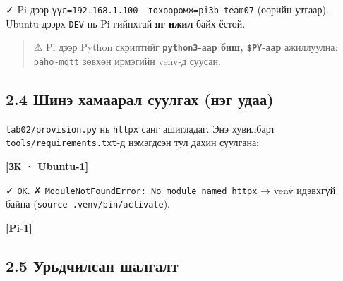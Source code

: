 ✓ Pi дээр \texttt{үүл=\allowbreak{}192.\allowbreak{}168.\allowbreak{}1.\allowbreak{}100\ \ төхөөрөмж=\allowbreak{}pi3b-team07} (өөрийн утгаар). Ubuntu дээрх \texttt{DEV} нь Pi-гийнхтай \textbf{яг ижил} байх ёстой.

\begin{quote}
⚠ Pi дээр Python скриптийг \textbf{\texttt{python3}-аар биш, \texttt{\$PY}-аар} ажиллуулна: \texttt{paho-mqtt} зөвхөн ирмэгийн venv-д суусан.
\end{quote}

\hypertarget{ux448ux438ux43dux44d-ux445ux430ux43cux430ux430ux440ux430ux43b-ux441ux443ux443ux43bux433ux430ux445-ux43dux44dux433-ux443ux434ux430ux430}{%
\subsection{2.4 Шинэ хамаарал суулгах (нэг удаа)}\label{ux448ux438ux43dux44d-ux445ux430ux43cux430ux430ux440ux430ux43b-ux441ux443ux443ux43bux433ux430ux445-ux43dux44dux433-ux443ux434ux430ux430}}

\texttt{lab02/\allowbreak{}provision.\allowbreak{}py} нь \texttt{httpx} санг ашигладаг. Энэ хувилбарт \texttt{tools/\allowbreak{}requirements.\allowbreak{}txt}-д нэмэгдсэн тул дахин суулгана:

\textbf{{[}ЗК · Ubuntu-1{]}}

\begin{Shaded}
\begin{Highlighting}[]
\end{Highlighting}
\end{Shaded}

✓ \texttt{OK}. ✗ \texttt{ModuleNotFoundError:\ No\ module\ named\ \textquotesingle{}httpx\textquotesingle{}} → venv идэвхгүй байна (\texttt{source\ .\allowbreak{}venv/\allowbreak{}bin/\allowbreak{}activate}).

\textbf{{[}Pi-1{]}}

\begin{Shaded}
\begin{Highlighting}[]
\end{Highlighting}
\end{Shaded}

\hypertarget{ux443ux440ux44cux434ux447ux438ux43bux441ux430ux43d-ux448ux430ux43bux433ux430ux43bux442}{%
\subsection{2.5 Урьдчилсан шалгалт}\label{ux443ux440ux44cux434ux447ux438ux43bux441ux430ux43d-ux448ux430ux43bux433ux430ux43bux442}}

